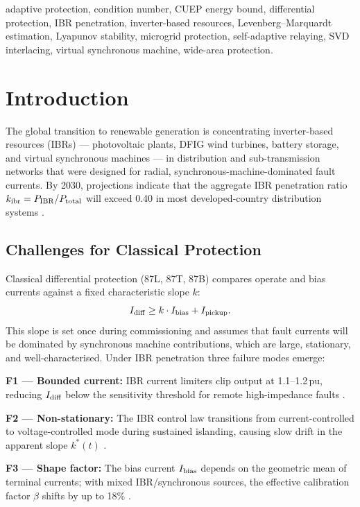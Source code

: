\documentclass[journal,twoside,10pt]{IEEEtran}
\newcommand{\kibr}{k_{\rm ibr}}
\begin{document}
\begin{IEEEkeywords}
adaptive protection, condition number, CUEP energy bound, differential
protection, IBR penetration, inverter-based resources, Levenberg--Marquardt
estimation, Lyapunov stability, microgrid protection, self-adaptive relaying,
SVD interlacing, virtual synchronous machine, wide-area protection.
\end{IEEEkeywords}

\section{Introduction}
\label{sec:intro}

The global transition to renewable generation is concentrating
inverter-based resources (IBRs) --- photovoltaic plants, DFIG wind
turbines, battery storage, and virtual synchronous machines --- in
distribution and sub-transmission networks that were designed for
radial, synchronous-machine-dominated fault currents.  By 2030,
projections indicate that the aggregate IBR penetration ratio
$\kibr = P_{\rm IBR}/P_{\rm total}$ will exceed 0.40 in most
developed-country distribution systems \cite{milano2018foundations,
du2020comparative}.

\subsection{Challenges for Classical Protection}

Classical differential protection (87L, 87T, 87B) compares operate
and bias currents against a fixed characteristic slope $k$:
\[
  I_{\rm diff} \geq k \cdot I_{\rm bias} + I_{\rm pickup}.
\]
This slope is set once during commissioning and assumes that fault
currents will be dominated by synchronous machine contributions,
which are large, stationary, and well-characterised.  Under IBR
penetration three failure modes emerge:

\textbf{F1 — Bounded current:} IBR current limiters clip output at
1.1--1.2\,pu, reducing $I_{\rm diff}$ below the sensitivity threshold
for remote high-impedance faults \cite{hooshyar2019inverter}.

\textbf{F2 — Non-stationary:} The IBR control law transitions from
current-controlled to voltage-controlled mode during sustained
islanding, causing slow drift in the apparent slope $k^*(t)$
\cite{pattabiraman2018comparison}.

\textbf{F3 — Shape factor:} The bias current $I_{\rm bias}$ depends
on the geometric mean of terminal currents; with mixed IBR/synchronous
sources, the effective calibration factor $\beta$ shifts by up to
18\% \cite{sambps_g7_field}.
\end{document}
